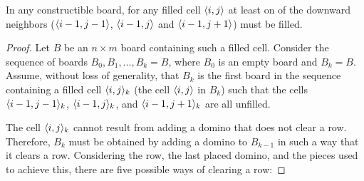 \begin{lemma} \label{lemma:floating}
  In any constructible board, for any filled cell $\cell$ at least on of the downward neighbors ($\cell[i-1][j-1]$, $\cell[i-1][j]$ and $\cell[i-1][j+1]$) must be filled.
\end{lemma}  

\begin{proof}  
Let \(B\) be an \(n \times m\) board containing such a filled cell. Consider the sequence of boards \(B_0, B_1, \dots, B_k = B\), where \(B_0\) is an empty board and \(B_k = B\). Assume, without loss of generality, that \(B_k\) is the first board in the sequence containing a filled cell \(\cell_k\) (the cell \(\cell\) in \(B_k\)) such that the cells \(\cell[i-1][j-1]_k\), \(\cell[i-1][j]_k\), and \(\cell[i-1][j+1]_k\) are all unfilled.


The cell \(\cell_k\) cannot result from adding a domino that does not clear a row. Therefore, \(B_k\) must be obtained by adding a domino to \(B_{k-1}\) in such a way that it clears a row. Considering the row, the last placed domino, and the pieces used to achieve this, there are five possible ways of clearing a row:


\end{proof}
